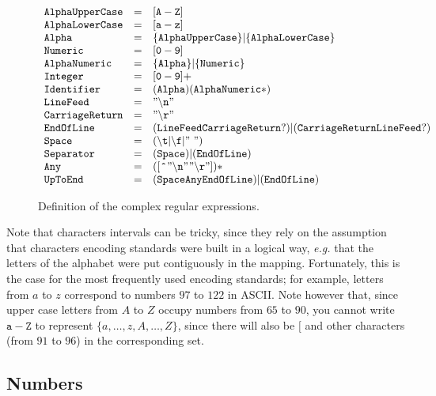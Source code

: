\documentclass[a4paper]{article}
\begin{document}
\begin{figure}[ht]
  \centering
$\begin{array}{lcl}
\mathtt{AlphaUpperCase} & = & \mathtt{[A-Z]} \\
\mathtt{AlphaLowerCase} & = & \mathtt{[a-z]} \\
\mathtt{Alpha}          & = & \mathtt{\{AlphaUpperCase\}|\{AlphaLowerCase\}} \\
\mathtt{Numeric}        & = & \mathtt{[0-9]} \\
\mathtt{AlphaNumeric}   & = & \mathtt{\{Alpha\}|\{Numeric\}} \\
\mathtt{Integer}        & = & \mathtt{[0-9]+} \\
\mathtt{Identifier}        & = & \mathtt{({Alpha})({AlphaNumeric}*)} \\
\mathtt{LineFeed}       & = & \mathtt{"\backslash n"} \\
\mathtt{CarriageReturn} & = & \mathtt{"\backslash r"} \\
\mathtt{EndOfLine}        & = & \mathtt{({LineFeed}{CarriageReturn}?) | ({CarriageReturn}{LineFeed}?)} \\
\mathtt{Space}          & = & \mathtt{(\backslash t | \backslash f | "\ ")} \\
\mathtt{Separator}         & = & \mathtt{({Space}) | ({EndOfLine})} \\
\mathtt{Any}         & = & \mathtt{([\ \hat{}\ "\backslash n""\backslash r"])*} \\
\mathtt{UpToEnd}         & = & \mathtt{({Space}{Any}{EndOfLine}) | ({EndOfLine})}
\end{array}$
\caption{Definition of the complex regular expressions.}
\label{fig:regexs}
\end{figure}

Note that characters intervals can be tricky, since they rely on the assumption that characters encoding standards were built in a logical way, \emph{e.g.} that the letters of the alphabet were put contiguously in the mapping. Fortunately, this is the case for the most frequently used encoding standards; for example, letters from $a$ to $z$ correspond to numbers $97$ to $122$ in ASCII. Note however that, since upper case letters from $A$ to $Z$ occupy numbers from $65$ to $90$, you cannot write $\mathtt{a-Z}$ to represent $\{a, \dots, z, A, \dots, Z\}$, since there will also be $[$ and other characters (from $91$ to $96$) in the corresponding set.

\subsection{Numbers}
\end{document}
